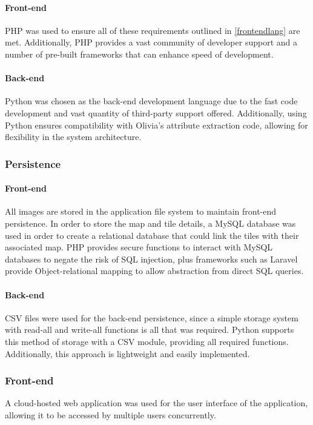 \paragraph{Front-end\\}
PHP was used to ensure all of these requirements outlined in \ref{frontendlang} are met. Additionally, PHP provides a vast community of developer support and a number of pre-built frameworks that can enhance speed of development.
\paragraph{Back-end\\}
Python was chosen as the back-end development language due to the fast code development and vast quantity of third-party support offered. Additionally, using Python ensures compatibility with Olivia’s attribute extraction code, allowing for flexibility in the system architecture. 
\subsubsection{Persistence}
\paragraph{Front-end\\}
All images are stored in the application file system to maintain front-end persistence. In order to store the map and tile details, a MySQL database was used in order to create a relational database that could link the tiles with their associated map. PHP provides secure functions to interact with MySQL databases to negate the risk of SQL injection, plus frameworks such as Laravel provide Object-relational mapping to allow abstraction from direct SQL queries.
\paragraph{Back-end\\}
CSV files were used for the back-end persistence, since a simple storage system with read-all and write-all functions is all that was required. Python supports this method of storage with a CSV module, providing all required functions. Additionally, this approach is lightweight and easily implemented. 
\subsubsection{Front-end}
A cloud-hosted web application was used for the user interface of the application, allowing it to be accessed by multiple users concurrently.
